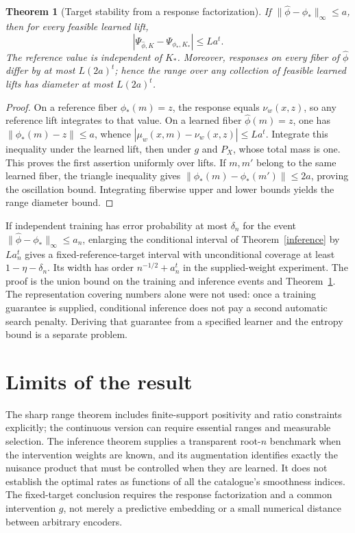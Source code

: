 \documentclass[11pt]{article}
\newtheorem{theorem}{Theorem}
\theoremstyle{remark}
\begin{document}
\begin{theorem}[Target stability from a response factorization]\label{stability}
If $\|\widehat\phi-\phi_*\|_\infty\leq a$, then for every feasible learned lift,
\[
 |\Psi_{\widehat\phi,K}-\Psi_{\phi_*,K_*}|\leq La^t.
\]
The reference value is independent of $K_*$. Moreover, responses on every fiber of $\widehat\phi$ differ by at most $L(2a)^t$; hence the range over any collection of feasible learned lifts has diameter at most $L(2a)^t$.
\end{theorem}
\begin{proof}
On a reference fiber $\phi_*(m)=z$, the response equals $\nu_w(x,z)$, so any reference lift integrates to that value. On a learned fiber $\widehat\phi(m)=z$, one has $\|\phi_*(m)-z\|\leq a$, whence
$|\mu_w(x,m)-\nu_w(x,z)|\leq La^t$. Integrate this inequality under the learned lift, then under $g$ and $P_X$, whose total mass is one. This proves the first assertion uniformly over lifts. If $m,m'$ belong to the same learned fiber, the triangle inequality gives $\|\phi_*(m)-\phi_*(m')\|\leq2a$, proving the oscillation bound. Integrating fiberwise upper and lower bounds yields the range diameter bound.
\end{proof}

If independent training has error probability at most $\delta_n$ for the event $\|\widehat\phi-\phi_*\|_\infty\leq a_n$, enlarging the conditional interval of Theorem~\ref{inference} by $La_n^t$ gives a fixed-reference-target interval with unconditional coverage at least $1-\eta-\delta_n$. Its width has order $n^{-1/2}+a_n^t$ in the supplied-weight experiment. The proof is the union bound on the training and inference events and Theorem~\ref{stability}. The representation covering numbers alone were not used: once a training guarantee is supplied, conditional inference does not pay a second automatic search penalty. Deriving that guarantee from a specified learner and the entropy bound is a separate problem.

\section{Limits of the result}
The sharp range theorem includes finite-support positivity and ratio constraints explicitly; the continuous version can require essential ranges and measurable selection. The inference theorem supplies a transparent root-$n$ benchmark when the intervention weights are known, and its augmentation identifies exactly the nuisance product that must be controlled when they are learned. It does not establish the optimal rates as functions of all the catalogue's smoothness indices. The fixed-target conclusion requires the response factorization and a common intervention $g$, not merely a predictive embedding or a small numerical distance between arbitrary encoders.
\end{document}
